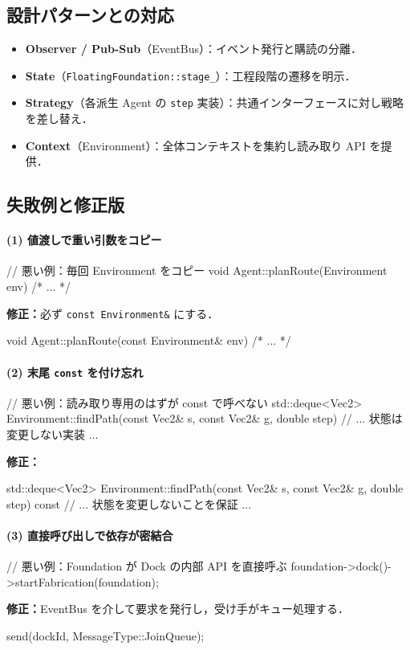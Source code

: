 \documentclass[10pt,letterpaper]{jsarticle}
\begin{document}
\subsection{設計パターンとの対応}
\begin{itemize}
\item \textbf{Observer / Pub-Sub}（EventBus）：イベント発行と購読の分離．
\item \textbf{State}（\texttt{FloatingFoundation::stage\_}）：工程段階の遷移を明示．
\item \textbf{Strategy}（各派生 Agent の \texttt{step} 実装）：共通インターフェースに対し戦略を差し替え．
\item \textbf{Context}（Environment）：全体コンテキストを集約し読み取り API を提供．
\end{itemize}

\subsection{失敗例と修正版}
\paragraph{(1) 値渡しで重い引数をコピー}
\begin{cppcode}
// 悪い例：毎回 Environment をコピー
void Agent::planRoute(Environment env) { /* ... */ }
\end{cppcode}
\textbf{修正：}必ず \texttt{const Environment\&} にする．
\begin{cppcode}
void Agent::planRoute(const Environment& env) { /* ... */ }
\end{cppcode}

\paragraph{(2) 末尾 \texttt{const} を付け忘れ}
\begin{cppcode}
// 悪い例：読み取り専用のはずが const で呼べない
std::deque<Vec2> Environment::findPath(const Vec2& s, const Vec2& g, double step) {
// ... 状態は変更しない実装 ...
}
\end{cppcode}
\textbf{修正：}
\begin{cppcode}
std::deque<Vec2> Environment::findPath(const Vec2& s, const Vec2& g, double step) const {
// ... 状態を変更しないことを保証 ...
}
\end{cppcode}

\paragraph{(3) 直接呼び出しで依存が密結合}
\begin{cppcode}
// 悪い例：Foundation が Dock の内部 API を直接呼ぶ
foundation->dock()->startFabrication(foundation);
\end{cppcode}
\textbf{修正：}EventBus を介して要求を発行し，受け手がキュー処理する．
\begin{cppcode}
send(dockId, MessageType::JoinQueue);
\end{cppcode}
\end{document}
